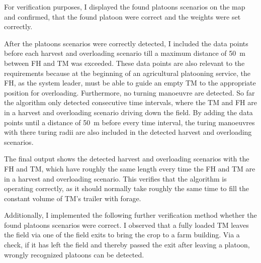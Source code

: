 For verification purposes, I displayed the found platoons scenarios on the map
and confirmed, that the found platoon were correct and the weights were set correctly.

After the platoons scenarios were correctly detected, I included the data points before each harvest and overloading scenario
till a maximum distance of \SI{50}{\metre} between \ac{FH} and \ac{TM} was exceeded.
These data points are also relevant to the requirements because at the beginning of an agricultural platooning service,
the \ac{FH}, as the system leader, must be able to guide an empty \ac{TM} to the appropriate position for overloading.
Furthermore, no turning manoeuvre are detected. So far the algorithm only detected consecutive time intervals, where the
\ac{TM} and \ac{FH} are in a harvest and overloading scenario driving down the field. By adding the data points until a distance
of \SI{50}{\metre} before every time interval, the turing manoeuvres with there turing radii are also included in the detected
harvest and overloading scenarios.

The final output shows the detected harvest and overloading scenarios with the \ac{FH} and \ac{TM}, which have roughly the same
length every time the \ac{FH} and \ac{TM} are in a harvest and overloading scenario. This verifies that the algorithm is
operating correctly, as it should normally take roughly the same time to fill the constant volume of \ac{TM}'s trailer with forage.

Additionally, I implemented the following further verification method whether the found platoons scenarios were correct.
I observed that a fully loaded \ac{TM} leaves the field via one of the field exits to bring the crop to a farm building.
Via a check, if it has left the field and thereby passed the exit after leaving a platoon, wrongly recognized
platoons can be detected.


